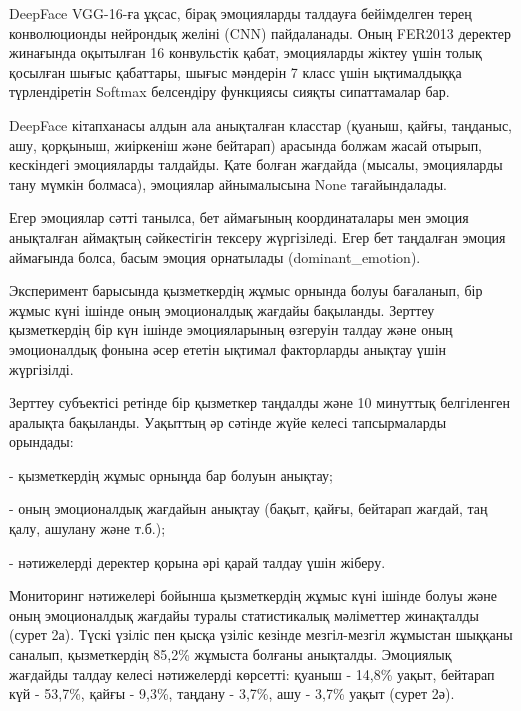 \begin{multicols}{2}
DeepFace VGG-16-ға ұқсас, бірақ эмоцияларды талдауға бейімделген терең
конволюционды нейрондық желіні (CNN) пайдаланады. Оның FER2013 деректер
жинағында оқытылған 16 конвульстік қабат, эмоцияларды жіктеу үшін толық
қосылған шығыс қабаттары, шығыс мәндерін 7 класс үшін ықтималдыққа
түрлендіретін Softmax белсендіру функциясы сияқты сипаттамалар бар.

DeepFace кітапханасы алдын ала анықталған класстар (қуаныш, қайғы,
таңданыс, ашу, қорқыныш, жиіркеніш және бейтарап) арасында болжам жасай
отырып, кескіндегі эмоцияларды талдайды. Қате болған жағдайда (мысалы,
эмоцияларды тану мүмкін болмаса), эмоциялар айнымалысына None
тағайындалады.

Егер эмоциялар сәтті танылса, бет аймағының координаталары мен эмоция
анықталған аймақтың сәйкестігін тексеру жүргізіледі. Егер бет таңдалған
эмоция аймағында болса, басым эмоция орнатылады (dominant\_emotion).

Эксперимент барысында қызметкердің жұмыс орнында болуы бағаланып, бір
жұмыс күні ішінде оның эмоционалдық жағдайы бақыланды. Зерттеу
қызметкердің бір күн ішінде эмоцияларының өзгеруін талдау және оның
эмоционалдық фонына әсер ететін ықтимал факторларды анықтау үшін
жүргізілді.

Зерттеу субъектісі ретінде бір қызметкер таңдалды және 10 минуттық
белгіленген аралықта бақыланды. Уақыттың әр сәтінде жүйе келесі
тапсырмаларды орындады:

- қызметкердің жұмыс орныңда бар болуын анықтау;

- оның эмоционалдық жағдайын анықтау (бақыт, қайғы, бейтарап жағдай, таң
қалу, ашулану және т.б.);

- нәтижелерді деректер қорына әрі қарай талдау үшін жіберу.

Мониторинг нәтижелері бойынша қызметкердің жұмыс күні ішінде болуы және
оның эмоционалдық жағдайы туралы статистикалық мәліметтер жинақталды
(сурет 2а). Түскі үзіліс пен қысқа үзіліс кезінде мезгіл-мезгіл жұмыстан
шыққаны саналып, қызметкердің 85,2\% жұмыста болғаны анықталды.
Эмоциялық жағдайды талдау келесі нәтижелерді көрсетті: қуаныш - 14,8\%
уақыт, бейтарап күй - 53,7\%, қайғы - 9,3\%, таңдану - 3,7\%, ашу -
3,7\% уақыт (сурет 2ә).

\end{multicols}

